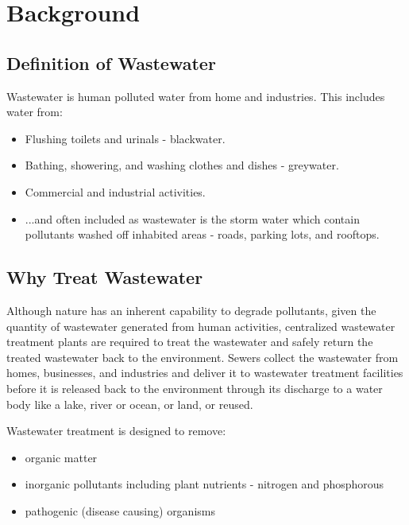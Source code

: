 \documentclass{article}
\begin{document}
\section{Background}
\subsection{Definition of Wastewater}

Wastewater is human polluted water from home and industries. This includes water from:
\begin{itemize}
\item Flushing toilets and urinals  - blackwater.
\item Bathing, showering, and washing clothes and dishes  - greywater.
\item Commercial and industrial activities.
\item ...and often included as wastewater is the storm water which contain pollutants washed off inhabited areas - roads, parking lots, and rooftops.
\end{itemize}

\subsection{Why Treat Wastewater}
Although nature has an inherent capability to degrade pollutants, given the quantity of wastewater generated from human activities, centralized wastewater treatment plants are required to treat the wastewater and safely return the treated wastewater back to the environment.  Sewers collect the wastewater from homes, businesses, and industries and deliver it to wastewater treatment facilities before it is released back to the environment through its discharge to a water body like a lake, river or ocean, or land, or reused. 

Wastewater treatment is designed to remove:
\begin{itemize}
\item organic matter
\item inorganic  pollutants including plant nutrients - nitrogen and phosphorous\\
\item pathogenic (disease causing) organisms\\
\end{itemize}
\end{document}
